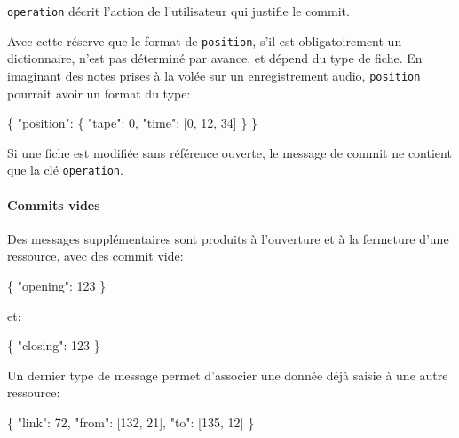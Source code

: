 \documentclass[11pt]{article}
\newenvironment{Shaded}{}{}
\newcommand{\DataTypeTok}[1]{\textcolor[rgb]{0.56,0.13,0.00}{{#1}}}
\newcommand{\DecValTok}[1]{\textcolor[rgb]{0.25,0.63,0.44}{{#1}}}
\newcommand{\NormalTok}[1]{{#1}}
\begin{document}
\texttt{operation} décrit l'action de l'utilisateur qui justifie le
commit.

Avec cette réserve que le format de \texttt{position}, s'il est
obligatoirement un dictionnaire, n'est pas déterminé par avance, et
dépend du type de fiche. En imaginant des notes prises à la volée sur un
enregistrement audio, \texttt{position} pourrait avoir un format du
type:

\begin{Shaded}
\begin{Highlighting}[]
\NormalTok{\{}
    \DataTypeTok{"position"}\NormalTok{: \{}
        \DataTypeTok{"tape"}\NormalTok{: }\DecValTok{0}\NormalTok{,}
        \DataTypeTok{"time"}\NormalTok{: [}\DecValTok{0}\NormalTok{, }\DecValTok{12}\NormalTok{, }\DecValTok{34}\NormalTok{]}
    \NormalTok{\}}
\NormalTok{\}}
\end{Highlighting}
\end{Shaded}

Si une fiche est modifiée sans référence ouverte, le message de commit
ne contient que la clé \texttt{operation}.

\paragraph{Commits vides}\label{commits-vides}

Des messages supplémentaires sont produits à l'ouverture et à la
fermeture d'une ressource, avec des commit vide:

\begin{Shaded}
\begin{Highlighting}[]
\NormalTok{\{}
    \DataTypeTok{"opening"}\NormalTok{: }\DecValTok{123}
\NormalTok{\}}
\end{Highlighting}
\end{Shaded}

et:

\begin{Shaded}
\begin{Highlighting}[]
\NormalTok{\{}
    \DataTypeTok{"closing"}\NormalTok{: }\DecValTok{123}
\NormalTok{\}}
\end{Highlighting}
\end{Shaded}

Un dernier type de message permet d'associer une donnée déjà saisie à
une autre ressource:

\begin{Shaded}
\begin{Highlighting}[]
\NormalTok{\{}
    \DataTypeTok{"link"}\NormalTok{: }\DecValTok{72}\NormalTok{,}
    \DataTypeTok{"from"}\NormalTok{: [}\DecValTok{132}\NormalTok{, }\DecValTok{21}\NormalTok{],}
    \DataTypeTok{"to"}\NormalTok{:   [}\DecValTok{135}\NormalTok{, }\DecValTok{12}\NormalTok{]}
\NormalTok{\}}
\end{Highlighting}
\end{Shaded}
\end{document}
